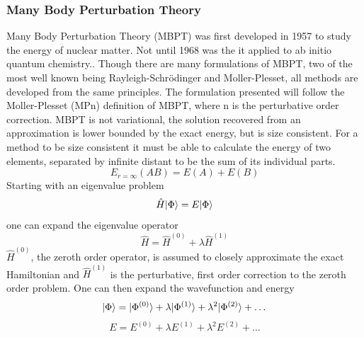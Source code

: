     \subsubsection{Many Body Perturbation Theory}
      Many Body Perturbation Theory (MBPT) was first developed in 1957\cite{Brueckner, 1955} to study the energy of nuclear matter.  Not until 1968 was the it applied to ab initio quantum chemistry.\cite{Freed 1968, Freed 1971}.  Though there are many formulations of MBPT, two of the most well known being Rayleigh-Schr{\"o}dinger\cite{Lindgren 1974} and M{\/o}ller-Plesset\cite{Moller 1934, Raghavachari 1989}, all methods are developed from the same principles.  %
      The formulation presented will follow the M{\/o}ller-Plesset (MPn) definition of MBPT, where n is the perturbative order correction. 
      MBPT is not variational, the solution recovered from an approximation is lower bounded by the exact energy, but is size consistent.       %
      For a method to be size consistent it must be able to calculate the energy of two elements, separated by infinite distant to be the sum of its individual parts.  
        \begin{equation}
        	E_{r=\infty}(AB) = E(A) + E(B)
        \end{equation}
      Starting with an eigenvalue problem
        \begin{equation} \label{eigenvalue}
        	\hat{H}| \Phi \rangle =  E| \Phi \rangle
        \end{equation}
      one can expand the eigenvalue operator
      \begin{equation}
      	\hat{H} = \hat{H}^{(0)} + \lambda \hat{H}^{(1)}
      \end{equation}
      $\hat{H}^{(0)}$, the zeroth order operator, is assumed to closely approximate the exact Hamiltonian and $\hat{H}^{(1)}$ is the perturbative, first order correction to the zeroth order problem. One can then expand the wavefunction and energy
        \begin{equation}
        	| \Phi \rangle = | \Phi^{(0)} \rangle + \lambda | \Phi^{(1)} \rangle +  \lambda^2 | \Phi^{(2)} \rangle + \dots\\
        \end{equation}
        \begin{equation}
        	E = E^{(0)} + \lambda E^{(1)} + \lambda^2 E^{(2)} + \dots
        \end{equation}
